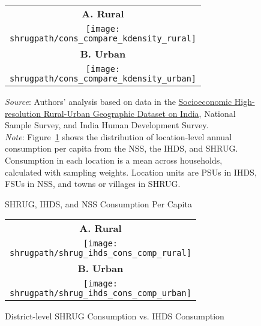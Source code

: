 \documentclass[12pt,letterpaper]{article}
\newcommand{\panel}{\fontfamily{phv}\selectfont\scriptsize\textbf}
\newcommand{\shrugpath}{.}
\begin{document}
\begin{appendix}
\begin{table}[H]
  \label{tab:emp_conc}
\end{table}


\newpage
\begin{figure}[H]\caption{SHRUG, IHDS, and NSS Consumption Per Capita}
\begin{center}
  \begin{tabular}{c}
    \panel{A. Rural} \\
    \texttt{[image: \\shrugpath/cons\_compare\_kdensity\_rural]} \\
    \panel{B. Urban} \\
    \texttt{[image: \\shrugpath/cons\_compare\_kdensity\_urban]} 
  \end{tabular}
\end{center}

\begin{adjustwidth}{2cm}{2cm}
  \footnotesize{\textit{Source}: Authors' analysis based on data in the
    \href{http://www.devdatalab.org/shrug}{Socioeconomic
      High-resolution Rural-Urban Geographic Dataset on India},
    National Sample Survey, and India Human Development
    Survey. \\ \textit{Note}: Figure~\ref{fig:ihds_nss_shrug_cons_kdensity} shows the
    distribution of location-level annual consumption per capita from the
    NSS, the IHDS, and SHRUG. Consumption in each location is a mean
    across households, calculated with sampling weights. Location
    units are PSUs in IHDS, FSUs in NSS, and towns or villages in
    SHRUG.}
\end{adjustwidth}

\label{fig:ihds_nss_shrug_cons_kdensity}
\end{figure}

\newpage
\begin{figure}[H]\caption{District-level SHRUG Consumption vs. IHDS Consumption}
\begin{center}
  \begin{tabular}{c}
    \panel{A. Rural} \\
    \texttt{[image: \\shrugpath/shrug\_ihds\_cons\_comp\_rural]} \\
    \panel{B. Urban} \\
    \texttt{[image: \\shrugpath/shrug\_ihds\_cons\_comp\_urban]} \\
  \end{tabular}
\end{center}


\end{figure}
\end{appendix}
\end{document}

